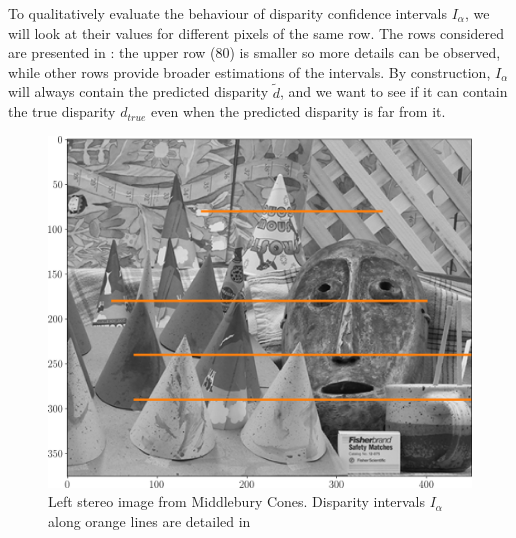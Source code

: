 To qualitatively evaluate the behaviour of disparity confidence intervals $I_\alpha$, we will look at their values for different pixels of the same row. The rows considered are presented in : the upper row ($80$) is smaller so more details can be observed, while other rows provide broader estimations of the intervals. By construction, $I_\alpha$ will always contain the predicted disparity $\tilde{d}$, and we want to see if it can contain the true disparity $d_{true}$ even when the predicted disparity is far from it.  

\begin{figure}
    \centering
    \includegraphics[width=0.5\linewidth]{Images/Chap_5/cones_with_rows.png}
    \caption{Left stereo image from Middlebury Cones. Disparity intervals $I_\alpha$ along orange lines are detailed in }
    \label{fig:cones_with_rows}
\end{figure}


